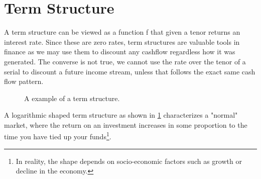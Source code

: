\section{Term Structure}

A term structure can be viewed as a function f that given a tenor returns 
an interest rate. Since these are zero rates, term structures are valuable 
tools in finance as we may use them to discount any cashflow regardless how it
was generated. The converse is not true, we cannot use the rate over the tenor
of a serial to discount a future income stream, unless that follows the exact
same cash flow pattern.\\

\begin{figure}[h!]
\begin{center}
\caption{A example of a term structure.}
\label{fig:anc}
\end{center}
\end{figure}

A logarithmic shaped term structure as shown in \ref{fig:anc} characterizes a
"normal" market, where the return on an investment increases in some proportion
to the time you have tied up your funds\footnote{In reality, the shape depends on 
socio-economic factors such as growth or decline in the economy.}.\\

